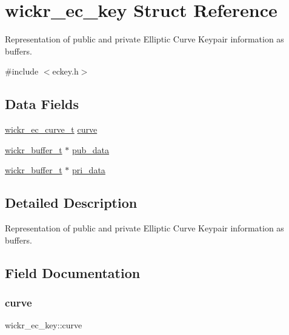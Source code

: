 \hypertarget{structwickr__ec__key}{}\section{wickr\+\_\+ec\+\_\+key Struct Reference}
\label{structwickr__ec__key}


Representation of public and private Elliptic Curve Keypair information as buffers.  




{\ttfamily \#include $<$eckey.\+h$>$}

\subsection*{Data Fields}
\begin{DoxyCompactItemize}
\item 
\hyperlink{structwickr__ec__curve}{wickr\+\_\+ec\+\_\+curve\+\_\+t} \hyperlink{structwickr__ec__key_a0fbe90131941d685f618ef6816e8c471}{curve}
\item 
\hyperlink{structwickr__buffer}{wickr\+\_\+buffer\+\_\+t} $\ast$ \hyperlink{structwickr__ec__key_af972d3c8b571df0ef009ebf079705e82}{pub\+\_\+data}
\item 
\hyperlink{structwickr__buffer}{wickr\+\_\+buffer\+\_\+t} $\ast$ \hyperlink{structwickr__ec__key_a67c23110b722401c6ba8b883b3aa74fc}{pri\+\_\+data}
\end{DoxyCompactItemize}


\subsection{Detailed Description}
Representation of public and private Elliptic Curve Keypair information as buffers. 

\subsection{Field Documentation}
\mbox{\label{structwickr__ec__key_a0fbe90131941d685f618ef6816e8c471}} 
\subsubsection{\texorpdfstring{curve}{curve}}
{\footnotesize\ttfamily wickr\+\_\+ec\+\_\+key\+::curve}

